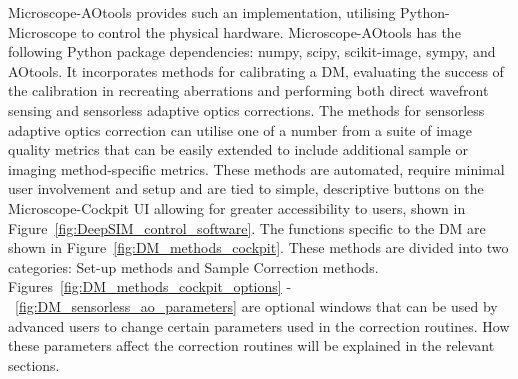 Microscope-AOtools provides such an implementation, utilising 
Python-Microscope to control the physical hardware. Microscope-AOtools
has the following Python package dependencies: numpy\cite{walt2011numpy},
scipy\cite{virtanen2020scipy}, scikit-image\cite{van2014scikit}, 
sympy\cite{meurer2017sympy}, and AOtools\cite{townson2019aotools}.
It incorporates methods for calibrating a DM, evaluating the success
of the calibration in recreating aberrations and performing both
direct wavefront sensing and sensorless adaptive optics
corrections. The methods for sensorless adaptive optics correction can
utilise one of a number from a suite of image quality metrics that can be easily extended to include additional sample or imaging method-specific metrics. These methods are automated, require minimal user involvement and setup and are tied to simple, descriptive  buttons on the Microscope-Cockpit UI allowing for greater accessibility to users, shown in Figure~\ref{fig:DeepSIM_control_software}. The functions specific to the DM are shown in Figure~\ref{fig:DM_methods_cockpit}. These methods are divided into two categories: Set-up methods and Sample Correction methods. Figures~\ref{fig:DM_methods_cockpit_options} -~\ref{fig:DM_sensorless_ao_parameters} are optional windows that can be used by advanced users to change certain parameters used in the correction routines. How these parameters affect the correction routines will be explained in the relevant sections.

